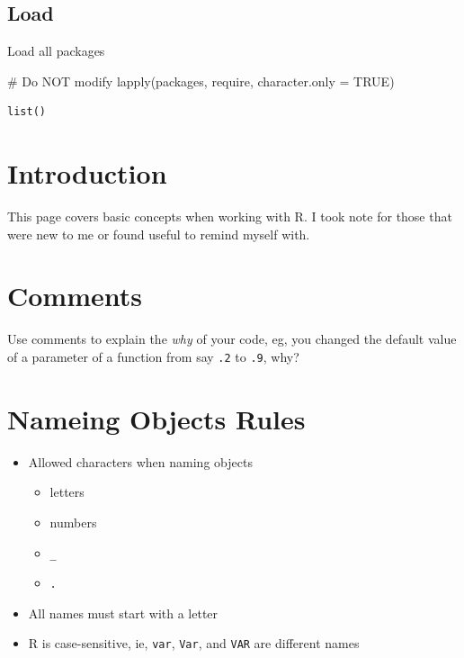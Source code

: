 \documentclass[
  letterpaper,
  DIV=11,
  numbers=noendperiod]{scrreprt}
\newenvironment{Shaded}{\begin{snugshade}}{\end{snugshade}}
\newcommand{\AttributeTok}[1]{\textcolor[rgb]{0.40,0.45,0.13}{#1}}
\newcommand{\CommentTok}[1]{\textcolor[rgb]{0.37,0.37,0.37}{#1}}
\newcommand{\ConstantTok}[1]{\textcolor[rgb]{0.56,0.35,0.01}{#1}}
\newcommand{\FunctionTok}[1]{\textcolor[rgb]{0.28,0.35,0.67}{#1}}
\newcommand{\NormalTok}[1]{\textcolor[rgb]{0.00,0.23,0.31}{#1}}
\providecommand{\tightlist}{%
  \setlength{\itemsep}{0pt}\setlength{\parskip}{0pt}}\usepackage{longtable,booktabs,array}
\begin{document}
\subsection*{Load}\label{load-3}

Load all packages

\begin{Shaded}
\begin{Highlighting}[]
\CommentTok{\# Do NOT modify}
\FunctionTok{lapply}\NormalTok{(packages, require, }\AttributeTok{character.only =} \ConstantTok{TRUE}\NormalTok{)}
\end{Highlighting}
\end{Shaded}

\begin{verbatim}
list()
\end{verbatim}

\section{Introduction}\label{introduction-1}

This page covers basic concepts when working with R. I took note for
those that were new to me or found useful to remind myself with.

\section{Comments}\label{comments}

Use comments to explain the \emph{why} of your code, eg, you changed the
default value of a parameter of a function from say \texttt{.2} to
\texttt{.9}, why?

\section{Nameing Objects Rules}\label{nameing-objects-rules}

\begin{itemize}
\tightlist
\item
  Allowed characters when naming objects

  \begin{itemize}
  \tightlist
  \item
    letters
  \item
    numbers
  \item
    \texttt{\_}
  \item
    \texttt{.}
  \end{itemize}
\item
  All names must start with a letter
\item
  R is case-sensitive, ie, \texttt{var}, \texttt{Var}, and \texttt{VAR}
  are different names
\end{itemize}
\end{document}
